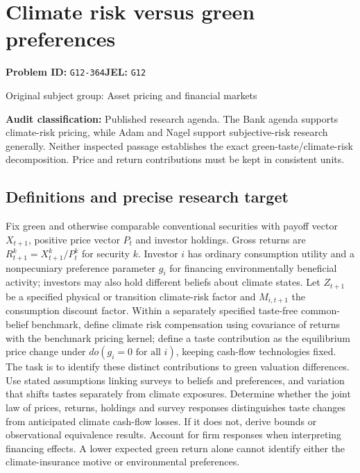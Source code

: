\documentclass[11pt,a4paper]{article}
\begin{document}
\section*{Climate risk versus green preferences}
\textbf{Problem ID:} \texttt{G12-364}\quad \textbf{JEL:} \texttt{G12}\par
\label{problem:OP-0318}
{\sffamily\small\color{muted}Original subject group: Asset pricing and financial markets\par}
\label{definitions:problem:30007600}
\textbf{Audit classification:} Published research agenda. The Bank agenda supports climate-risk pricing, while Adam and Nagel support subjective-risk research generally. Neither inspected passage establishes the exact green-taste/climate-risk decomposition. Price and return contributions must be kept in consistent units.
\subsection*{Definitions and precise research target}
Fix green and otherwise comparable conventional securities with payoff vector \(X_{t+1}\), positive price vector \(P_t\) and investor holdings. Gross returns are \(R^k_{t+1}=X^k_{t+1}/P^k_t\) for security \(k\). Investor \(i\) has ordinary consumption utility and a nonpecuniary preference parameter \(g_i\) for financing environmentally beneficial activity; investors may also hold different beliefs about climate states. Let \(Z_{t+1}\) be a specified physical or transition climate-risk factor and \(M_{i,t+1}\) the consumption discount factor. Within a separately specified taste-free common-belief benchmark, define climate risk compensation using covariance of returns with the benchmark pricing kernel; define a taste contribution as the equilibrium price change under \(do(g_i=0\text{ for all }i)\), keeping cash-flow technologies fixed. The task is to identify these distinct contributions to green valuation differences. Use stated assumptions linking surveys to beliefs and preferences, and variation that shifts tastes separately from climate exposures. Determine whether the joint law of prices, returns, holdings and survey responses distinguishes taste changes from anticipated climate cash-flow losses. If it does not, derive bounds or observational equivalence results. Account for firm responses when interpreting financing effects. A lower expected green return alone cannot identify either the climate-insurance motive or environmental preferences.
\end{document}
